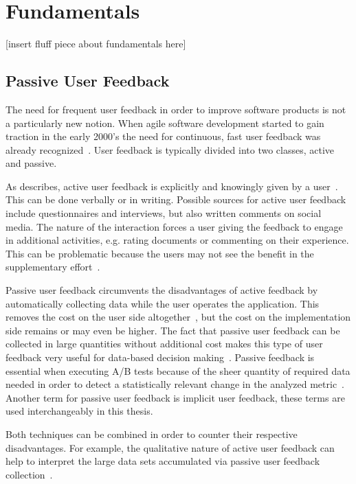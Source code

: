 %
\chapter{Fundamentals}
\label{ch:fundamentals}

[insert fluff piece about fundamentals here]

\section{Passive User Feedback}
\label{sec:fundamentals:implicit}

The need for frequent user feedback in order to improve software products is not a particularly new notion.
When agile software development started to gain traction in the early 2000's the need for continuous, fast user feedback was already recognized~\cite{Williams2003}.
User feedback is typically divided into two classes, active and passive.

As \citeauthor{Bosch2012} describes, active user feedback is explicitly and knowingly given by a user~\cite{Bosch2012}.
This can be done verbally or in writing.
Possible sources for active user feedback include questionnaires and interviews, but also written comments on social media.
The nature of the interaction forces a user giving the feedback to engage in additional activities, e.g. rating documents or commenting on their experience.
This can be problematic because the users may not see the benefit in the supplementary effort~\cite{Kelly:2003:IFI:959258.959260}.

Passive user feedback circumvents the disadvantages of active feedback by automatically collecting data while the user operates the application.
This removes the cost on the user side altogether~\cite{Kelly:2003:IFI:959258.959260}, but the cost on the implementation side remains or may even be higher.
The fact that passive user feedback can be collected in large quantities without additional cost makes this type of user feedback very useful for data-based decision making~\cite{Bosch2012}.
Passive feedback is essential when executing A/B tests because of the sheer quantity of required data needed in order to detect a statistically relevant change in the analyzed metric~\cite{Kohavi2009}.
Another term for passive user feedback is implicit user feedback, these terms are used interchangeably in this thesis.

Both techniques can be combined in order to counter their respective disadvantages.
For example, the qualitative nature of active user feedback can help to interpret the large data sets accumulated via passive user feedback collection~\cite{Kelly:2003:IFI:959258.959260}.

